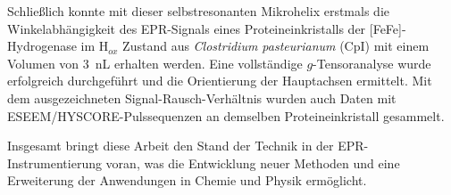 Schließlich konnte mit dieser selbstresonanten Mikrohelix erstmals die Winkelabhängigkeit des EPR-Signals eines Proteineinkristalls der [FeFe]-Hydrogenase im H$_{ox}$ Zustand aus \textit{Clostridium pasteurianum} (CpI) mit einem Volumen von 3~nL erhalten werden. 
Eine vollständige $g$-Tensoranalyse wurde erfolgreich durchgeführt und die Orientierung der Hauptachsen ermittelt. Mit dem ausgezeichneten Signal-Rausch-Verhältnis wurden auch Daten mit ESEEM/HYSCORE-Pulssequenzen an demselben Proteineinkristall gesammelt.

Insgesamt bringt diese Arbeit den Stand der Technik in der EPR-Instrumentierung voran, was die Entwicklung neuer Methoden und eine Erweiterung der Anwendungen in Chemie und Physik ermöglicht.

